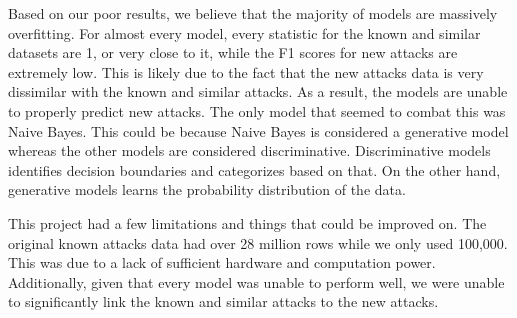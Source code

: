 Based on our poor results, we believe that the majority of models are massively overfitting. For almost every model, every statistic for the known and similar datasets are 1, or very close to it, while the F1 scores for new attacks are extremely low. This is likely due to the fact that the new attacks data is very dissimilar with the known and similar attacks. As a result, the models are unable to properly predict new attacks. The only model that seemed to combat this was Naive Bayes. This could be because Naive Bayes is considered a generative model whereas the other models are considered discriminative. Discriminative models identifies decision boundaries and categorizes based on that. On the other hand, generative models learns the probability distribution of the data.

This project had a few limitations and things that could be improved on. The original known attacks data had over 28 million rows while we only used 100,000. This was due to a lack of sufficient hardware and computation power. Additionally, given that every model was unable to perform well, we were unable to significantly link the known and similar attacks to the new attacks.

\ifCLASSOPTIONcaptionsoff
  \newpage
\fi




\vfill
